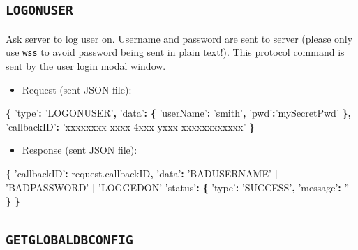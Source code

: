 \documentclass[]{book}
\newenvironment{Shaded}{\begin{snugshade}}{\end{snugshade}}
\newcommand{\AttributeTok}[1]{\textcolor[rgb]{0.77,0.63,0.00}{#1}}
\newcommand{\NormalTok}[1]{#1}
\newcommand{\OperatorTok}[1]{\textcolor[rgb]{0.81,0.36,0.00}{\textbf{#1}}}
\newcommand{\StringTok}[1]{\textcolor[rgb]{0.31,0.60,0.02}{#1}}
\newcommand{\VariableTok}[1]{\textcolor[rgb]{0.00,0.00,0.00}{#1}}
\providecommand{\tightlist}{%
  \setlength{\itemsep}{0pt}\setlength{\parskip}{0pt}}
\theoremstyle{definition}
\theoremstyle{definition}
\theoremstyle{definition}
\theoremstyle{remark}
\begin{document}
\hypertarget{logonuser}{%
\subsection{\texorpdfstring{\texttt{LOGONUSER}}{LOGONUSER}}\label{logonuser}}

Ask server to log user on. Username and password are sent to server
(please only use \texttt{wss} to avoid password being sent in plain
text!). This protocol command is sent by the user login modal window.

\begin{itemize}
\tightlist
\item
  Request (sent JSON file):
\end{itemize}

\begin{Shaded}
\begin{Highlighting}[]
\OperatorTok{\{}
  \StringTok{'type'}\OperatorTok{:} \StringTok{'LOGONUSER'}\OperatorTok{,}
  \StringTok{'data'}\OperatorTok{:} \OperatorTok{\{}
    \StringTok{'userName'}\OperatorTok{:} \StringTok{'smith'}\OperatorTok{,}
    \StringTok{'pwd'}\OperatorTok{:}\StringTok{'mySecretPwd'}
  \OperatorTok{\},}
  \StringTok{'callbackID'}\OperatorTok{:} \StringTok{'xxxxxxxx-xxxx-4xxx-yxxx-xxxxxxxxxxxx'}
\OperatorTok{\}}
\end{Highlighting}
\end{Shaded}

\begin{itemize}
\tightlist
\item
  Response (sent JSON file):
\end{itemize}

\begin{Shaded}
\begin{Highlighting}[]
\OperatorTok{\{}
  \StringTok{'callbackID'}\OperatorTok{:} \VariableTok{request}\NormalTok{.}\AttributeTok{callbackID}\OperatorTok{,}
  \StringTok{'data'}\OperatorTok{:} \StringTok{'BADUSERNAME'} \OperatorTok{|} \StringTok{'BADPASSWORD'} \OperatorTok{|} \StringTok{'LOGGEDON'}
  \StringTok{'status'}\OperatorTok{:} \OperatorTok{\{}
    \StringTok{'type'}\OperatorTok{:} \StringTok{'SUCCESS'}\OperatorTok{,}
    \StringTok{'message'}\OperatorTok{:} \StringTok{''}
  \OperatorTok{\}}
\OperatorTok{\}}
\end{Highlighting}
\end{Shaded}

\hypertarget{getglobaldbconfig}{%
\subsection{\texorpdfstring{\texttt{GETGLOBALDBCONFIG}}{GETGLOBALDBCONFIG}}\label{getglobaldbconfig}}
\end{document}
